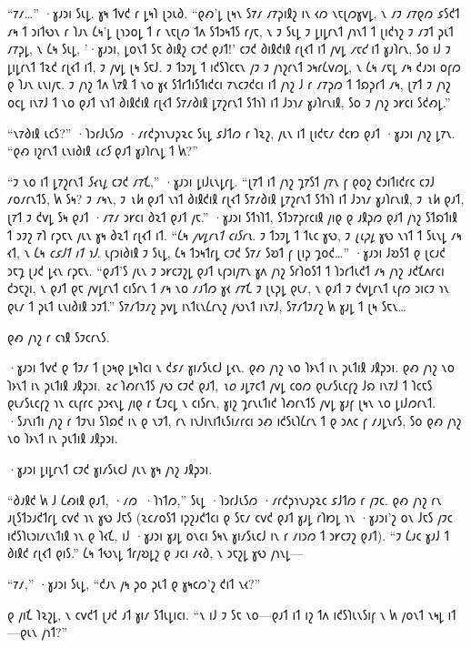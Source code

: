 “𐑳𐑥…” ·𐑣𐑨𐑮𐑦 𐑕𐑧𐑛. 𐑣𐑰 𐑑𐑫𐑒 𐑩 𐑛𐑰𐑐 𐑚𐑮𐑧𐑔. “𐑞𐑺'𐑛 𐑚𐑰𐑯 𐑕𐑳𐑥 𐑥𐑳𐑜𐑦𐑙𐑟 𐑦𐑯 𐑬𐑼 𐑯𐑱𐑚𐑼𐑣𐑫𐑛, 𐑯 𐑥𐑲 𐑥𐑳𐑞𐑼 𐑭𐑕𐑒𐑑 𐑥𐑰 𐑑 𐑮𐑦𐑑𐑻𐑯 𐑩 𐑐𐑨𐑯 𐑖𐑰'𐑛 𐑚𐑪𐑮𐑴𐑛 𐑑 𐑩 𐑯𐑱𐑚𐑼 𐑑𐑵 𐑕𐑑𐑮𐑰𐑑𐑕 𐑩𐑢𐑱, 𐑯 𐑲 𐑕𐑧𐑛 𐑲 𐑛𐑦𐑛𐑩𐑯𐑑 𐑢𐑪𐑯𐑑 𐑑 𐑚𐑦𐑒𐑪𐑟 𐑲 𐑥𐑲𐑑 𐑜𐑧𐑑 𐑥𐑳𐑜𐑛, 𐑯 𐑖𐑰 𐑕𐑧𐑛, '·𐑣𐑨𐑮𐑦, 𐑛𐑴𐑯𐑑 𐑕𐑱 𐑔𐑦𐑙𐑟 𐑤𐑲𐑒 𐑞𐑨𐑑!' 𐑤𐑲𐑒 𐑔𐑦𐑙𐑒𐑦𐑙 𐑩𐑚𐑬𐑑 𐑦𐑑 𐑢𐑫𐑛 \emph{𐑥𐑱𐑒} 𐑦𐑑 𐑣𐑨𐑐𐑩𐑯, 𐑕𐑴 𐑦𐑓 𐑲 𐑛𐑦𐑛𐑩𐑯𐑑 𐑑𐑷𐑒 𐑩𐑚𐑬𐑑 𐑦𐑑, 𐑲 𐑢𐑫𐑛 𐑚𐑰 𐑕𐑱𐑓. 𐑲 𐑑𐑮𐑲𐑛 𐑑 𐑦𐑒𐑕𐑐𐑤𐑱𐑯 𐑢𐑲 𐑲 𐑢𐑪𐑟𐑩𐑯𐑑 𐑮𐑰𐑩𐑖𐑫𐑼𐑛, 𐑯 𐑖𐑰 𐑥𐑱𐑛 𐑥𐑰 𐑒𐑨𐑮𐑦 𐑴𐑝𐑼 𐑞 𐑐𐑨𐑯 𐑧𐑯𐑦𐑢𐑱. 𐑲 𐑢𐑪𐑟 𐑑𐑵 𐑘𐑳𐑙 𐑑 𐑯𐑴 𐑣𐑬 𐑕𐑑𐑩𐑑𐑦𐑕𐑑𐑦𐑒𐑤𐑦 𐑳𐑯𐑤𐑲𐑒𐑤𐑦 𐑦𐑑 𐑢𐑪𐑟 𐑓 𐑩 𐑥𐑳𐑜𐑼 𐑑 𐑑𐑸𐑜𐑩𐑑 𐑥𐑰, 𐑚𐑳𐑑 𐑲 𐑢𐑪𐑟 𐑴𐑤𐑛 𐑦𐑯𐑳𐑓 𐑑 𐑯𐑴 𐑞𐑨𐑑 𐑯𐑪𐑑 𐑔𐑦𐑙𐑒𐑦𐑙 𐑩𐑚𐑬𐑑 𐑕𐑳𐑥𐑔𐑦𐑙 𐑛𐑳𐑟𐑩𐑯𐑑 𐑕𐑑𐑪𐑐 𐑦𐑑 𐑓𐑮𐑪𐑥 𐑣𐑨𐑐𐑩𐑯𐑦𐑙, 𐑕𐑴 𐑲 𐑢𐑪𐑟 𐑮𐑾𐑤𐑦 𐑕𐑒𐑺𐑛.”

“𐑯𐑳𐑔𐑦𐑙 𐑧𐑤𐑕?” ·𐑐𐑮𐑩𐑓𐑧𐑕𐑼 ·𐑥𐑩𐑒𐑜𐑪𐑯𐑨𐑜𐑷𐑤 𐑕𐑧𐑛 𐑭𐑓𐑑𐑼 𐑩 𐑐𐑷𐑟, 𐑢𐑧𐑯 𐑦𐑑 𐑚𐑦𐑒𐑱𐑥 𐑒𐑤𐑽 𐑞𐑨𐑑 ·𐑣𐑨𐑮𐑦 𐑢𐑪𐑟 𐑛𐑳𐑯. “𐑞𐑺 𐑦𐑟𐑩𐑯𐑑 𐑧𐑯𐑦𐑔𐑦𐑙 \emph{𐑧𐑤𐑕} 𐑞𐑨𐑑 𐑣𐑨𐑐𐑩𐑯𐑛 𐑑 𐑿?”

“𐑲 𐑯𐑴 𐑦𐑑 𐑛𐑳𐑟𐑩𐑯𐑑 \emph{𐑕𐑬𐑯𐑛} 𐑤𐑲𐑒 𐑥𐑳𐑗,” ·𐑣𐑨𐑮𐑦 𐑛𐑦𐑓𐑧𐑯𐑛𐑩𐑛. “𐑚𐑳𐑑 𐑦𐑑 𐑢𐑪𐑟 𐑡𐑳𐑕𐑑 𐑢𐑳𐑯 𐑝 𐑞𐑴𐑟 𐑒𐑮𐑦𐑑𐑦𐑒𐑩𐑤 𐑤𐑲𐑓 𐑥𐑴𐑥𐑩𐑯𐑑𐑕, 𐑿 𐑕𐑰? 𐑲 𐑥𐑰𐑯, 𐑲 \emph{𐑯𐑿} 𐑞𐑨𐑑 𐑯𐑪𐑑 𐑔𐑦𐑙𐑒𐑦𐑙 𐑩𐑚𐑬𐑑 𐑕𐑳𐑥𐑔𐑦𐑙 𐑛𐑳𐑟𐑩𐑯𐑑 𐑕𐑑𐑪𐑐 𐑦𐑑 𐑓𐑮𐑪𐑥 𐑣𐑨𐑐𐑩𐑯𐑦𐑙, 𐑲 \emph{𐑯𐑿} 𐑞𐑨𐑑, 𐑚𐑳𐑑 𐑲 𐑒𐑫𐑛 𐑕𐑰 𐑞𐑨𐑑 ·𐑥𐑳𐑥 𐑮𐑾𐑤𐑦 𐑔𐑷𐑑 𐑞𐑨𐑑 𐑢𐑱.” ·𐑣𐑨𐑮𐑦 𐑕𐑑𐑪𐑐𐑑, 𐑕𐑑𐑮𐑳𐑜𐑩𐑤𐑦𐑙 𐑢𐑦𐑞 𐑞 𐑨𐑙𐑜𐑼 𐑞𐑨𐑑 𐑢𐑪𐑟 𐑕𐑑𐑸𐑑𐑦𐑙 𐑑 𐑮𐑲𐑟 𐑳𐑐 𐑩𐑜𐑱𐑯 𐑢𐑧𐑯 𐑣𐑰 𐑔𐑷𐑑 𐑩𐑚𐑬𐑑 𐑦𐑑. “𐑖𐑰 \emph{𐑢𐑫𐑛𐑩𐑯𐑑 𐑤𐑦𐑕𐑩𐑯}. 𐑲 𐑑𐑮𐑲𐑛 𐑑 𐑑𐑧𐑤 𐑣𐑻, 𐑲 \emph{𐑚𐑧𐑜𐑛} 𐑣𐑻 𐑯𐑪𐑑 𐑑 𐑕𐑧𐑯𐑛 𐑥𐑰 𐑬𐑑, 𐑯 𐑖𐑰 \emph{𐑤𐑭𐑓𐑑 𐑦𐑑 𐑪𐑓}. 𐑧𐑝𐑮𐑦𐑔𐑦𐑙 𐑲 𐑕𐑧𐑛, 𐑖𐑰 𐑑𐑮𐑰𐑑𐑩𐑛 𐑤𐑲𐑒 𐑕𐑳𐑥 𐑕𐑹𐑑 𐑝 𐑚𐑦𐑜 𐑡𐑴𐑒…” ·𐑣𐑨𐑮𐑦 𐑓𐑹𐑕𐑑 𐑞 𐑚𐑤𐑨𐑒 𐑮𐑱𐑡 𐑚𐑨𐑒 𐑛𐑬𐑯 𐑩𐑜𐑱𐑯. “𐑞𐑨𐑑'𐑕 𐑢𐑧𐑯 𐑲 𐑮𐑾𐑤𐑲𐑟𐑛 𐑞𐑨𐑑 𐑧𐑝𐑮𐑦𐑢𐑳𐑯 𐑣𐑵 𐑢𐑪𐑟 𐑕𐑩𐑐𐑴𐑕𐑑 𐑑 𐑐𐑮𐑩𐑑𐑧𐑒𐑑 𐑥𐑰 𐑢𐑪𐑟 𐑨𐑒𐑗𐑵𐑩𐑤𐑦 𐑒𐑮𐑱𐑟𐑦, 𐑯 𐑞𐑨𐑑 𐑞𐑱 𐑢𐑫𐑛𐑩𐑯𐑑 𐑤𐑦𐑕𐑩𐑯 𐑑 𐑥𐑰 𐑯𐑴 𐑥𐑨𐑑𐑼 𐑣𐑬 𐑥𐑳𐑗 𐑲 𐑚𐑧𐑜𐑛 𐑞𐑧𐑥, 𐑯 𐑞𐑨𐑑 𐑲 𐑒𐑫𐑛𐑩𐑯𐑑 𐑧𐑝𐑼 𐑮𐑦𐑤𐑲 𐑪𐑯 𐑞𐑧𐑥 𐑑 𐑜𐑧𐑑 𐑧𐑯𐑦𐑔𐑦𐑙 𐑮𐑲𐑑.” 𐑕𐑳𐑥𐑑𐑲𐑥𐑟 𐑜𐑫𐑛 𐑦𐑯𐑑𐑧𐑯𐑖𐑩𐑯𐑟 𐑢𐑻𐑯𐑑 𐑦𐑯𐑳𐑓, 𐑕𐑳𐑥𐑑𐑲𐑥𐑟 𐑿 𐑣𐑨𐑛 𐑑 𐑚𐑰 𐑕𐑱𐑯…

𐑞𐑺 𐑢𐑪𐑟 𐑩 𐑤𐑪𐑙 𐑕𐑲𐑤𐑩𐑯𐑕.

·𐑣𐑨𐑮𐑦 𐑑𐑫𐑒 𐑞 𐑑𐑲𐑥 𐑑 𐑚𐑮𐑰𐑞 𐑛𐑰𐑐𐑤𐑦 𐑯 𐑒𐑭𐑥 𐑣𐑦𐑥𐑕𐑧𐑤𐑓 𐑛𐑬𐑯. 𐑞𐑺 𐑢𐑪𐑟 𐑯𐑴 𐑐𐑶𐑯𐑑 𐑦𐑯 𐑜𐑧𐑑𐑦𐑙 𐑨𐑙𐑜𐑮𐑦. 𐑞𐑺 𐑢𐑪𐑟 𐑯𐑴 𐑐𐑶𐑯𐑑 𐑦𐑯 𐑜𐑧𐑑𐑦𐑙 𐑨𐑙𐑜𐑮𐑦. \emph{𐑷𐑤} 𐑐𐑺𐑩𐑯𐑑𐑕 𐑢𐑻 𐑤𐑲𐑒 𐑞𐑨𐑑, \emph{𐑯𐑴} 𐑨𐑛𐑳𐑤𐑑 𐑢𐑫𐑛 𐑤𐑴𐑼 𐑞𐑧𐑥𐑕𐑧𐑤𐑝𐑟 𐑓𐑸 𐑦𐑯𐑳𐑓 𐑑 𐑐𐑤𐑱𐑕 𐑞𐑧𐑥𐑕𐑧𐑤𐑝𐑟 𐑪𐑯 𐑤𐑧𐑝𐑩𐑤 𐑜𐑮𐑬𐑯𐑛 𐑢𐑦𐑞 𐑩 𐑗𐑲𐑤𐑛 𐑯 𐑤𐑦𐑕𐑩𐑯, 𐑣𐑦𐑟 𐑡𐑩𐑯𐑧𐑑𐑦𐑒 𐑐𐑺𐑩𐑯𐑑𐑕 𐑢𐑫𐑛 𐑣𐑨𐑝 𐑚𐑰𐑯 𐑯𐑴 𐑛𐑦𐑓𐑼𐑩𐑯𐑑. ·𐑕𐑨𐑯𐑦𐑑𐑦 𐑢𐑪𐑟 𐑩 𐑑𐑲𐑯𐑦 𐑕𐑐𐑸𐑒 𐑦𐑯 𐑞 𐑯𐑲𐑑, 𐑩𐑯 𐑦𐑯𐑓𐑦𐑯𐑦𐑑𐑧𐑕𐑦𐑥𐑩𐑤𐑦 𐑮𐑺 𐑦𐑒𐑕𐑧𐑐𐑖𐑩𐑯 𐑑 𐑞 𐑮𐑵𐑤 𐑝 𐑥𐑨𐑛𐑯𐑩𐑕, 𐑕𐑴 𐑞𐑺 𐑢𐑪𐑟 𐑯𐑴 𐑐𐑶𐑯𐑑 𐑦𐑯 𐑜𐑧𐑑𐑦𐑙 𐑨𐑙𐑜𐑮𐑦.

·𐑣𐑨𐑮𐑦 𐑛𐑦𐑛𐑩𐑯𐑑 𐑤𐑲𐑒 𐑣𐑦𐑥𐑕𐑧𐑤𐑓 𐑢𐑧𐑯 𐑣𐑰 𐑢𐑪𐑟 𐑨𐑙𐑜𐑮𐑦.

“𐑔𐑨𐑙𐑒 𐑿 𐑓 𐑖𐑺𐑦𐑙 𐑞𐑨𐑑, ·𐑥𐑼~·𐑐𐑪𐑑𐑼,” 𐑕𐑧𐑛 ·𐑐𐑮𐑩𐑓𐑧𐑕𐑼 ·𐑥𐑩𐑒𐑜𐑪𐑯𐑨𐑜𐑷𐑤 𐑭𐑓𐑑𐑼 𐑩 𐑢𐑲𐑤. 𐑞𐑺 𐑢𐑪𐑟 𐑩𐑯 𐑨𐑚𐑕𐑑𐑮𐑨𐑒𐑑𐑩𐑛 𐑤𐑫𐑒 𐑪𐑯 𐑣𐑻 𐑓𐑱𐑕 (𐑷𐑤𐑥𐑴𐑕𐑑 𐑦𐑜𐑟𐑨𐑒𐑑𐑤𐑦 𐑞 𐑕𐑱𐑥 𐑤𐑫𐑒 𐑞𐑨𐑑 𐑣𐑨𐑛 𐑩𐑐𐑽𐑛 𐑪𐑯 ·𐑣𐑨𐑮𐑦'𐑟 𐑴𐑯 𐑓𐑱𐑕 𐑢𐑲𐑤 𐑦𐑒𐑕𐑐𐑧𐑮𐑦𐑥𐑧𐑯𐑑𐑦𐑙 𐑪𐑯 𐑞 𐑐𐑬𐑗, 𐑦𐑓 ·𐑣𐑨𐑮𐑦 𐑣𐑨𐑛 𐑴𐑯𐑤𐑦 𐑕𐑰𐑯 𐑣𐑦𐑥𐑕𐑧𐑤𐑓 𐑦𐑯 𐑩 𐑥𐑦𐑮𐑼 𐑑 𐑮𐑾𐑤𐑲𐑟 𐑞𐑨𐑑). “𐑲 𐑖𐑨𐑤 𐑣𐑨𐑓 𐑑 𐑔𐑦𐑙𐑒 𐑩𐑚𐑬𐑑 𐑞𐑦𐑕.” 𐑖𐑰 𐑑𐑻𐑯𐑛 𐑑𐑩𐑢𐑹𐑛𐑟 𐑞 𐑨𐑤𐑦 𐑥𐑬𐑔, 𐑯 𐑮𐑱𐑟𐑛 𐑣𐑻 𐑢𐑪𐑯𐑛—

“𐑳𐑥,” ·𐑣𐑨𐑮𐑦 𐑕𐑧𐑛, “𐑒𐑨𐑯 𐑢𐑰 𐑜𐑴 𐑜𐑧𐑑 𐑞 𐑣𐑰𐑤𐑼'𐑟 𐑒𐑦𐑑 𐑯𐑬?”

𐑞 𐑢𐑦𐑗 𐑐𐑷𐑟𐑛, 𐑯 𐑤𐑫𐑒𐑑 𐑚𐑨𐑒 𐑨𐑑 𐑣𐑦𐑥 𐑕𐑑𐑧𐑛𐑦𐑤𐑦. “𐑯 𐑦𐑓 𐑲 𐑕𐑱 𐑯𐑴—𐑞𐑨𐑑 𐑦𐑑 𐑦𐑟 𐑑𐑵 𐑦𐑒𐑕𐑐𐑧𐑯𐑕𐑦𐑝 𐑯 𐑿 𐑢𐑴𐑯𐑑 𐑯𐑰𐑛 𐑦𐑑—𐑞𐑧𐑯 𐑢𐑪𐑑?”

